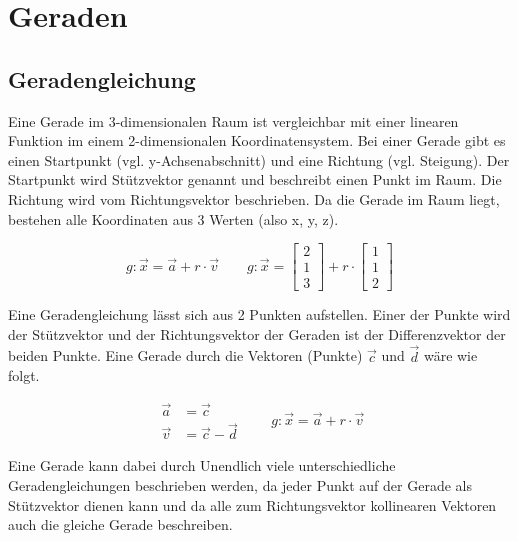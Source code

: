 \clearpage

\section{Geraden}

\subsection{Geradengleichung}

Eine Gerade im 3-dimensionalen Raum ist vergleichbar mit einer linearen Funktion im einem 2-dimensionalen
Koordinatensystem. Bei einer Gerade gibt es einen Startpunkt (vgl. y-Achsenabschnitt)
und eine Richtung (vgl. Steigung). Der Startpunkt wird Stützvektor genannt und beschreibt einen
Punkt im Raum. Die Richtung wird vom Richtungsvektor beschrieben. Da die Gerade im Raum
liegt, bestehen alle Koordinaten aus 3 Werten (also x, y, z).

\begin{equation*}
    g: \vec{x} = \vec{a} + r \cdot \vec{v}
    \qquad g: \vec{x} =
    \begin{bmatrix}
        2 \\
        1 \\
        3
    \end{bmatrix}
    +
    r \cdot
    \begin{bmatrix}
        1 \\
        1 \\
        2
    \end{bmatrix}
\end{equation*}

Eine Geradengleichung lässt sich aus 2 Punkten aufstellen. Einer der Punkte wird der
Stützvektor und der Richtungsvektor der Geraden ist der Differenzvektor der beiden Punkte.
Eine Gerade durch die Vektoren (Punkte) $\vec{c}$ und $\vec{d}$ wäre wie folgt.

\begin{equation*}
    \begin{aligned}
        \vec{a} & = \vec{c} \\
        \vec{v} & = \vec{c} - \vec{d}
    \end{aligned}
    \qquad g: \vec{x} = \vec{a} + r \cdot \vec{v}
\end{equation*}

Eine Gerade kann dabei durch Unendlich viele unterschiedliche Geradengleichungen
beschrieben werden, da jeder Punkt auf der Gerade als Stützvektor dienen kann
und da alle zum Richtungsvektor kollinearen Vektoren auch die gleiche Gerade
beschreiben.

